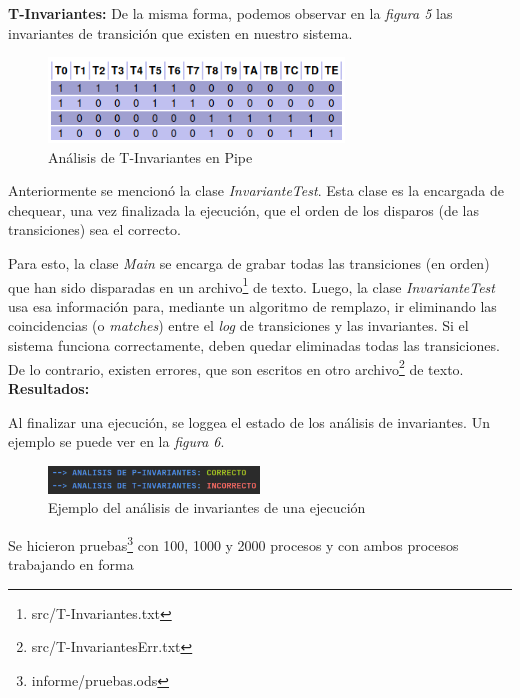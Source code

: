 \documentclass{article}
\newcommand{\fninv}{src/T-Invariantes.txt}
\newcommand{\fninverr}{src/T-InvariantesErr.txt}
\newcommand{\fnpruebas}{informe/pruebas.ods}
\begin{document}
    \textbf{T-Invariantes:} \newline \newline
    De la misma forma, podemos observar en la \emph{figura 5} las invariantes de transición
    que existen en nuestro sistema. \\
    \begin{figure}[h]
        \includegraphics[width=0.7\textwidth, center]{t-invariante.png}
        \caption{Análisis de T-Invariantes en Pipe}
    \end{figure}   
    Anteriormente se mencionó la clase \emph{InvarianteTest}. Esta clase es la encargada
    de chequear, una vez finalizada la ejecución, que el orden de los disparos (de las 
    transiciones) sea el correcto. \par
    Para esto, la clase \emph{Main} se encarga de grabar todas las transiciones (en orden) 
    que han sido disparadas en un archivo\footnote{\fninv} de texto. Luego, la
    clase \emph{InvarianteTest} usa esa información para, mediante un algoritmo de remplazo,
    ir eliminando las coincidencias (o \emph{matches}) entre el \emph{log} de transiciones y
    las invariantes. Si el sistema funciona correctamente, deben quedar eliminadas todas las
    transiciones. De lo contrario, existen errores, que son escritos en otro 
    archivo\footnote{\fninverr} de texto. \newline \newline
    \textbf{Resultados:} \newline \newline \par
    Al finalizar una ejecución, se loggea el estado de los análisis de invariantes. Un ejemplo
    se puede ver en la \emph{figura 6}. \par
    \begin{figure}[h]
        \includegraphics[width=0.5\textwidth, center]{analisis-invariantes-ej.png}
        \caption{Ejemplo del análisis de invariantes de una ejecución}
    \end{figure}
    Se hicieron pruebas\footnote{\fnpruebas} con 100, 1000 y 2000 procesos y con ambos procesos trabajando en forma
\end{document}
